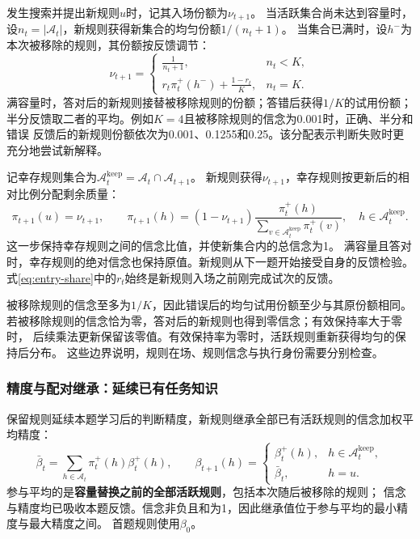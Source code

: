 \documentclass[11pt,a4paper]{article}
\numberwithin{equation}{section}
\newcommand{\A}{\mathcal{A}}
\begin{document}
发生搜索并提出新规则$u$时，记其入场份额为$\nu_{t+1}$。
当活跃集合尚未达到容量时，设$n_t=|\A_t|$，新规则获得新集合的均匀份额$1/(n_t+1)$。
当集合已满时，设$h^-$为本次被移除的规则，其份额按反馈调节：
\begin{equation}
\nu_{t+1}=\begin{cases}
\displaystyle\frac{1}{n_t+1},&n_t<K,\\[0.5em]
\displaystyle r_t\pi_t^+(h^-)+\frac{1-r_t}{K},&n_t=K.
\end{cases}
\label{eq:entry-share}
\end{equation}
满容量时，答对后的新规则接替被移除规则的份额；答错后获得$1/K$的试用份额；
半分反馈取二者的平均。例如$K=4$且被移除规则的信念为0.001时，正确、半分和错误
反馈后的新规则份额依次为0.001、0.1255和0.25。该分配表示判断失败时更充分地尝试新解释。

记幸存规则集合为$\A_t^{\mathrm{keep}}=\A_t\cap\A_{t+1}$。
新规则获得$\nu_{t+1}$，幸存规则按更新后的相对比例分配剩余质量：
\begin{equation}
\pi_{t+1}(u)=\nu_{t+1},\qquad
\pi_{t+1}(h)=(1-\nu_{t+1})
\frac{\pi_t^+(h)}{\sum_{v\in\A_t^{\mathrm{keep}}}\pi_t^+(v)},
\quad h\in\A_t^{\mathrm{keep}}.
\label{eq:entry-belief}
\end{equation}
这一步保持幸存规则之间的信念比值，并使新集合内的总信念为1。
满容量且答对时，幸存规则的绝对信念也保持原值。新规则从下一题开始接受自身的反馈检验。
式\eqref{eq:entry-share}中的$r_t$始终是新规则入场之前刚完成试次的反馈。

被移除规则的信念至多为$1/K$，因此错误后的均匀试用份额至少与其原份额相同。
若被移除规则的信念恰为零，答对后的新规则也得到零信念；有效保持率大于零时，
后续乘法更新保留该零值。有效保持率为零时，活跃规则重新获得均匀的保持后分布。
这些边界说明，规则在场、规则信念与执行身份需要分别检查。

\subsubsection{精度与配对继承：延续已有任务知识}
\label{sec:transfer}
保留规则延续本题学习后的判断精度，新规则继承全部已有活跃规则的信念加权平均精度：
\begin{equation}
\bar\beta_t=\sum_{h\in\A_t}\pi_t^+(h)\beta_t^+(h),\qquad
\beta_{t+1}(h)=\begin{cases}\beta_t^+(h),&h\in\A_t^{\mathrm{keep}},\\
\bar\beta_t,&h=u.\end{cases}
\label{eq:transfer}
\end{equation}
参与平均的是\textbf{容量替换之前的全部活跃规则}，包括本次随后被移除的规则；
信念与精度均已吸收本题反馈。信念非负且和为1，因此继承值位于参与平均的最小精度与最大精度之间。
首题规则使用$\beta_0$。
\end{document}
